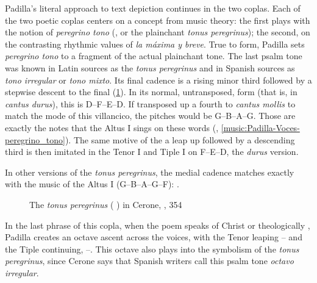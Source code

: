 Padilla's literal approach to text depiction continues in the two coplas.
Each of the two poetic coplas centers on a concept from music theory: the first
plays with the notion of \emph{peregrino tono} (, or the
plainchant \emph{tonus peregrinus}); the second, on the contrasting rhythmic
values of \emph{la máxima y breve}.
True to form, Padilla sets \emph{peregrino tono} to a fragment of the actual
plainchant tone.
The last psalm tone was known in Latin sources as the \emph{tonus peregrinus}
and in Spanish sources as \emph{tono irregular} or \emph{tono mixto}.
Its final cadence is a rising minor third followed by a stepwise descent to the
final (\cref{fig:Cerone-tonus_peregrinus}).%
    \Autocite[354]{Cerone:Melopeo}
In its normal, untransposed, form (that is, in \emph{cantus durus}), this is
D--F--E--D.
If transposed up a fourth to \emph{cantus mollis} to match the mode of this
villancico, the pitches would be G--B\fl{}--A--G. 
Those are exactly the notes that the Altus I sings on these words
(, \cref{music:Padilla-Voces-peregrino_tono}).
The same motive of the a leap up followed by a descending third is then imitated
in the Tenor I and Tiple I on F--E--D, the \emph{durus} version.%
\begin{Footnote}
    In other versions of the \emph{tonus peregrinus}, the medial cadence matches
    exactly with the music of the Altus I (G--B\fl{}--A--G--F):
    \autocite[160]{Catholic:LiberUsualis1956}.
\end{Footnote}

\begin{figure}
    \caption{The \emph{tonus peregrinus} (
    ) in Cerone, , 354}

    \label{fig:Cerone-tonus_peregrinus}
\end{figure}

\begin{musicexample}
    \caption{Gutiérrez de Padilla, , copla 1
    (): Point of imitation quoting cadences chant \emph{tonus
    peregrinus} on words \emph{peregrino tono}}

    \label{music:Padilla-Voces-peregrino_tono}
\end{musicexample}

In the last phrase of this copla, when the poem speaks of Christ  or theologically , Padilla
creates an octave ascent across the voices, with the Tenor leaping
-- and the Tiple continuing, --.
This octave also plays into the symbolism of the \emph{tonus peregrinus}, since
Cerone says that Spanish writers call this  psalm tone
\emph{octavo irregular}.%
    \Autocite[354]{Cerone:Melopeo}

